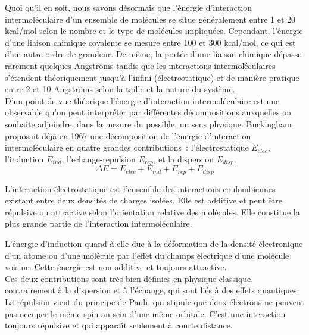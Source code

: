 Quoi qu’il en soit, nous savons désormais que l’énergie d'interaction intermoléculaire d'un ensemble de molécules se situe généralement entre 1 et 20 kcal/mol selon le nombre et le type de molécules impliquées. Cependant, l'énergie d'une liaison chimique covalente se mesure entre 100 et 300 kcal/mol, ce qui est d’un autre ordre de grandeur. De même, la portée d’une liaison chimique dépasse rarement quelques Angströms tandis que les interactions intermoléculaires s'étendent théoriquement jusqu'à l'infini (électrostatique) et de manière pratique entre 2 et 10 Angströms selon la taille et la nature du système.\\


D’un point de vue théorique l’énergie d’interaction intermoléculaire est une observable qu’on peut interpréter par différentes décompositions auxquelles on souhaite adjoindre, dans la mesure du possible, un sens physique. Buckingham \cite{buckingham1967permanent} proposait déjà en 1967 une décomposition de l’énergie d’interaction intermoléculaire en quatre grandes contributions : l’électrostatique $E_{elec}$, l’induction $E_{ind}$, l’echange-repulsion $E_{rep}$, et la dispersion $E_{disp}$.\\

\begin{equation}
\Delta E = E_{elec} + E_{ind} + E_{rep} + E_{disp}
\end{equation} 

L’interaction électrostatique est l’ensemble des interactions coulombiennes existant entre deux densités de charges isolées. Elle est additive et peut être répulsive ou attractive selon l’orientation relative des molécules. Elle constitue la plus grande partie de l’interaction intermoléculaire. 
 
L’énergie d’induction quand à elle due à la déformation de la densité électronique d’un atome ou d’une molécule par l’effet du champs électrique d’une molécule voisine. Cette énergie est non additive et toujours attractive.\\

Ces deux contributions sont très bien définies en physique classique, contrairement à la dispersion et à l’échange, qui sont liés à des effets quantiques.\\

La répulsion vient du principe de Pauli, qui stipule que deux électrons ne peuvent pas occuper le même spin au sein d’une même orbitale. C’est une interaction toujours répulsive et qui apparaît seulement à courte distance.\\

